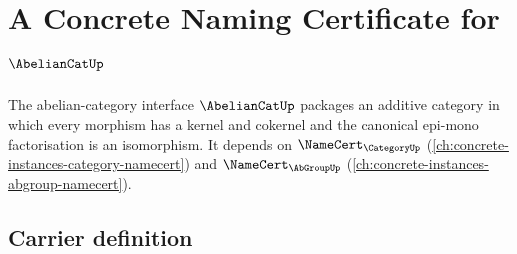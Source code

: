 \chapter{A Concrete Naming Certificate for $\AbelianCatUp$}
\label{ch:concrete-instances-abeliancat-namecert}

The abelian-category interface $\AbelianCatUp$ packages an additive category in which every morphism has a kernel and cokernel and the canonical epi-mono factorisation is an isomorphism. It depends on $\NameCert_{\CategoryUp}$ (\autoref{ch:concrete-instances-category-namecert}) and $\NameCert_{\AbGroupUp}$ (\autoref{ch:concrete-instances-abgroup-namecert}).

\section{Carrier definition}
\label{sec:abeliancat-carrier}

